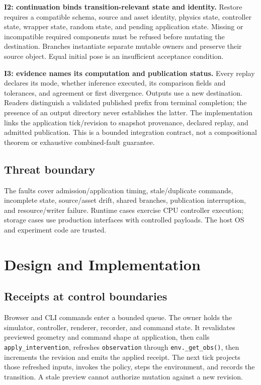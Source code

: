 \documentclass[10pt]{article}
\begin{document}
\textbf{I2: continuation binds transition-relevant state and identity.}
Restore requires a compatible schema, source and asset identity, physics state,
controller state, wrapper state, random state, and pending application state.
Missing or incompatible required components must be refused before mutating the
destination. Branches instantiate separate mutable owners and preserve their
source object. Equal initial pose is an insufficient acceptance condition.

\textbf{I3: evidence names its computation and publication status.}
Every replay declares its mode, whether inference executed, its comparison
fields and tolerances, and agreement or first divergence. Outputs use a new
destination. Readers distinguish a validated published prefix from terminal
completion; the presence of an output directory never establishes the latter.
The implementation links the application tick/revision to snapshot provenance,
declared replay, and admitted publication. This is a bounded integration
contract, not a compositional theorem or exhaustive combined-fault guarantee.

\subsection{Threat boundary}
The faults cover admission/application timing, stale/duplicate commands,
incomplete state, source/asset drift, shared branches, publication interruption,
and resource/writer failure. Runtime cases exercise CPU controller execution;
storage cases use production interfaces with controlled payloads. The host OS
and experiment code are trusted.

\section{Design and Implementation}
\subsection{Receipts at control boundaries}
Browser and CLI commands enter a bounded queue. The owner holds the simulator,
controller, renderer, recorder, and command state. It revalidates previewed
geometry and command shape at application, then
calls \texttt{apply\_intervention}, refreshes \texttt{observation} through
\texttt{env.\_get\_obs()}, then increments the revision and emits the applied
receipt. The next tick projects those refreshed inputs, invokes the policy,
steps the environment, and records the transition. A stale preview cannot
authorize mutation against a new revision.
\end{document}
